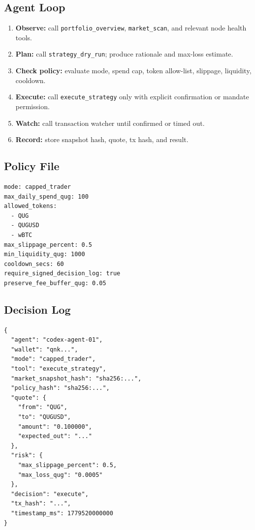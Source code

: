 \documentclass[11pt,a4paper]{article}
\begin{document}
\subsection{Agent Loop}

\begin{enumerate}[leftmargin=1.2cm]
  \item \textbf{Observe:} call \texttt{portfolio\_overview}, \texttt{market\_scan}, and relevant node health tools.
  \item \textbf{Plan:} call \texttt{strategy\_dry\_run}; produce rationale and max-loss estimate.
  \item \textbf{Check policy:} evaluate mode, spend cap, token allow-list, slippage, liquidity, cooldown.
  \item \textbf{Execute:} call \texttt{execute\_strategy} only with explicit confirmation or mandate permission.
  \item \textbf{Watch:} call transaction watcher until confirmed or timed out.
  \item \textbf{Record:} store snapshot hash, quote, tx hash, and result.
\end{enumerate}

\subsection{Policy File}

\begin{verbatim}
mode: capped_trader
max_daily_spend_qug: 100
allowed_tokens:
  - QUG
  - QUGUSD
  - wBTC
max_slippage_percent: 0.5
min_liquidity_qug: 1000
cooldown_secs: 60
require_signed_decision_log: true
preserve_fee_buffer_qug: 0.05
\end{verbatim}

\subsection{Decision Log}

\begin{verbatim}
{
  "agent": "codex-agent-01",
  "wallet": "qnk...",
  "mode": "capped_trader",
  "tool": "execute_strategy",
  "market_snapshot_hash": "sha256:...",
  "policy_hash": "sha256:...",
  "quote": {
    "from": "QUG",
    "to": "QUGUSD",
    "amount": "0.100000",
    "expected_out": "..."
  },
  "risk": {
    "max_slippage_percent": 0.5,
    "max_loss_qug": "0.0005"
  },
  "decision": "execute",
  "tx_hash": "...",
  "timestamp_ms": 1779520000000
}
\end{verbatim}
\end{document}
